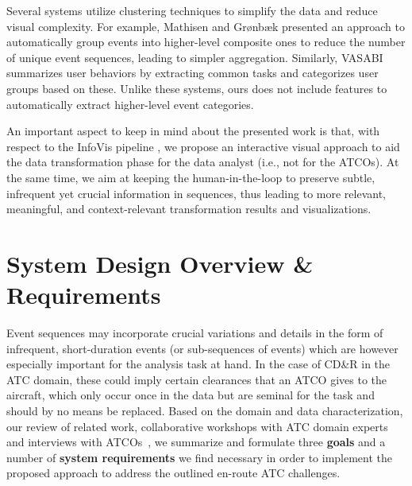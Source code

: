 \documentclass[camera]{vgtc}                          %
\begin{document}
Several systems utilize clustering techniques to simplify the data and reduce visual complexity. For example,
Mathisen and Grønbæk \cite{Mathisen2017Clear} presented an approach to automatically group events into higher-level composite ones to reduce the number of unique event sequences, leading to simpler aggregation. Similarly, VASABI \cite{Nguyen2020VASABI} summarizes user behaviors by extracting common tasks and categorizes user groups based on these.
Unlike these systems, ours does not include features to automatically extract higher-level event categories. 

An important aspect to keep in mind about the presented work is that, with respect to the InfoVis pipeline \cite{Card1999Readings}, we propose an interactive visual approach to aid the data transformation phase for the data analyst (i.e., not for the ATCOs). 
At the same time, we aim at keeping the human-in-the-loop to preserve subtle, infrequent yet crucial information in sequences, thus leading to more relevant, meaningful, and context-relevant transformation results and visualizations.



\vspace{-4pt}
\section{System Design Overview \& Requirements}
\label{sec:system-design}
Event sequences may incorporate crucial variations and details in the form of infrequent, short-duration events (or sub-sequences of events) which are however especially important for the analysis task at hand. In the case of CD\&R in the ATC domain, these could imply certain clearances that an ATCO gives to the aircraft, which only occur once in the data but are seminal for the task and should by no means be replaced. 
Based on the domain and data characterization, our review of related work, collaborative workshops with ATC domain experts and interviews with ATCOs~\cite{Meyer2022Mapping}, we summarize and formulate three \textbf{goals} and a number of \textbf{system requirements} we find necessary in order to implement the proposed approach to address the outlined en-route ATC challenges.\\
\end{document}
